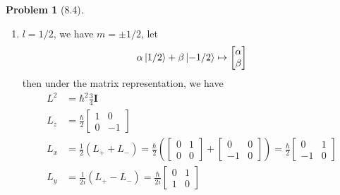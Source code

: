 \documentclass[twoside,11pt]{article}
\theoremstyle{definition}
\newtheorem{problem}{Problem}
\theoremstyle{remark}
\begin{document}
\begin{problem}[8.4]\
\begin{enumerate}[label=Case \arabic*., leftmargin=*]
\item $l=1/2$, we have $m=\pm 1/2$, let 
\begin{align*}
    \alpha\ket{1/2} + \beta\ket{-1/2} \mapsto
    \begin{bmatrix}
        \alpha\\ \beta
    \end{bmatrix}
\end{align*}
then under the matrix representation, we have
\begin{align*}
    L^2 &= \hbar^2 \frac{3}{4}\mathbf{I}\\
    L_z &= \frac{\hbar}{2}\begin{bmatrix}
        1 & 0\\
        0 & -1
    \end{bmatrix}\\
    L_x &= \frac{1}{2}(L_+ + L_-)
    = \frac{\hbar}{2}\left(
        \begin{bmatrix}
            0 & 1 \\ 0 & 0
        \end{bmatrix}
        + \begin{bmatrix}
            0 & 0 \\ -1 & 0
        \end{bmatrix}
    \right) = \frac{\hbar}{2}
    \begin{bmatrix}
        0 & 1\\ -1 & 0
    \end{bmatrix}\\
    L_y &= \frac{1}{2i}(L_+ - L_-) 
    = \frac{\hbar}{2i}\begin{bmatrix}
        0 & 1\\ 1 & 0
    \end{bmatrix}
\end{align*}


\end{enumerate}
\end{problem}
\end{document}
